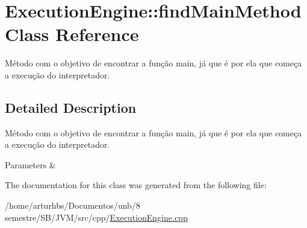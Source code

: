 \hypertarget{classExecutionEngine_1_1findMainMethod}{}\section{Execution\+Engine\+:\+:find\+Main\+Method Class Reference}
\label{classExecutionEngine_1_1findMainMethod}


Método com o objetivo de encontrar a função main, já que é por ela que começa a execução do interpretador.  




\subsection{Detailed Description}
Método com o objetivo de encontrar a função main, já que é por ela que começa a execução do interpretador. 


\begin{DoxyParams}{Parameters}
{\em } & \\
\hline
\end{DoxyParams}


The documentation for this class was generated from the following file\+:\begin{DoxyCompactItemize}
\item 
/home/arturhbs/\+Documentos/unb/8 semestre/\+S\+B/\+J\+V\+M/src/cpp/\hyperlink{ExecutionEngine_8cpp}{Execution\+Engine.\+cpp}\end{DoxyCompactItemize}
